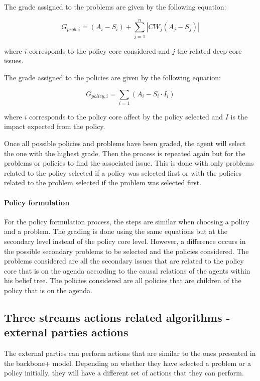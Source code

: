 The grade assigned to the problems are given by the following equation:

\begin{equation}
G_{prob, i} = \left( A_i - S_i \right) + \sum_{j=1}^n \left| CW_j \left( A_j - S_j \right) \right|
\end{equation}

where $i$ corresponds to the policy core considered and $j$ the related deep core issues.

The grade assigned to the policies are given by the following equation:

\begin{equation}
G_{policy, i} = \sum_{i=1} \left( A_i - S_i \cdot I_i \right)
\end{equation}

where $i$ corresponds to the policy core affect by the policy selected and $I$ is the impact expected from the policy.

Once all possible policies and problems have been graded, the agent will select the one with the highest grade. Then the process is repeated again but for the problems or policies to find the associated issue. This is done with only problems related to the policy selected if a policy was selected first or with the policies related to the problem selected if the problem was selected first.

\paragraph{Policy formulation}

For the policy formulation process, the steps are similar when choosing a policy and a problem. The grading is done using the same equations but at the secondary level instead of the policy core level. However, a difference occurs in the possible secondary problems to be selected and the policies considered. The problems considered are all the secondary issues that are related to the policy core that is on the agenda according to the causal relations of the agents within his belief tree. The policies considered are all policies that are children of the policy that is on the agenda.

\subsection{Three streams actions related algorithms - external parties actions}

The external parties can perform actions that are similar to the ones presented in the backbone+ model. Depending on whether they have selected a problem or a policy initially, they will have a different set of actions that they can perform.

